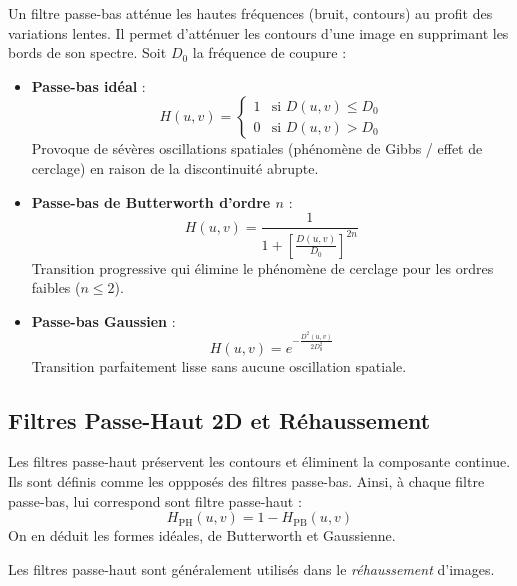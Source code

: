 Un filtre passe-bas atténue les hautes fréquences (bruit, contours) au profit des variations lentes. Il permet d'atténuer les contours d'une image en supprimant les bords de son spectre. Soit $D_0$ la fréquence de coupure :
\begin{itemize}
    \item \textbf{Passe-bas idéal} :
        \begin{equation}
            H(u,v) = \begin{cases} 1 & \text{si } D(u,v) \leqslant D_0 \\ 0 & \text{si } D(u,v) > D_0 \end{cases}
        \end{equation}
        Provoque de sévères oscillations spatiales (phénomène de Gibbs / effet de cerclage) en raison de la discontinuité abrupte.
    \item \textbf{Passe-bas de Butterworth d'ordre $n$} :
        \begin{equation}
            H(u,v) = \frac{1}{1 + \left[ \frac{D(u,v)}{D_0} \right]^{2n}}
        \end{equation}
        Transition progressive qui élimine le phénomène de cerclage pour les ordres faibles ($n \leqslant 2$).
    \item \textbf{Passe-bas Gaussien} :
        \begin{equation}
            H(u,v) = e^{-\frac{D^2(u,v)}{2D_0^2}}
        \end{equation}
        Transition parfaitement lisse sans aucune oscillation spatiale.
\end{itemize}

\subsection{Filtres Passe-Haut 2D et Réhaussement}

Les filtres passe-haut préservent les contours et éliminent la composante continue. Ils sont définis comme les oppposés des filtres passe-bas. Ainsi, à chaque filtre passe-bas, lui correspond sont filtre passe-haut :
\begin{equation}
    H_{\text{PH}}(u,v) = 1 - H_{\text{PB}}(u,v)
\end{equation}
On en déduit les formes idéales, de Butterworth et Gaussienne.

\begin{remark}
    Les filtres passe-haut sont généralement utilisés dans le \emph{réhaussement} d'images.
\end{remark}

